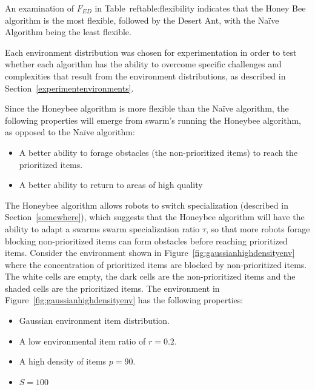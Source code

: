 An examination of $F_{ED}$ in Table~ref{table:flexibility} indicates that the Honey Bee algorithm is the most flexible, followed by the Desert Ant, with the Na\"ive Algorithm being the least flexible.

Each environment distribution was chosen for experimentation in order to test whether each algorithm has the ability to overcome specific challenges and complexities that result from the environment distributions, as described in Section~\ref{experimentenvironments}.

Since the Honeybee algorithm is more flexible than the Na\"ive algorithm, the following properties will emerge from swarm's running the Honeybee algorithm, as opposed to the Na\"ive algorithm:
\begin{itemize}
\item A better ability to forage obstacles (the non-prioritized items) to reach the prioritized items.
\item A better ability to return to areas of high quality
\end{itemize}
 
The Honeybee algorithm allows robots to switch specialization (described in Section~\ref{somewhere}), which suggests that the Honeybee algorithm will have the ability to adapt a swarms swarm specialization ratio $\tau$, so that more robots forage blocking non-prioritized items can form obstacles before reaching prioritized items. Consider the environment shown in Figure~\ref{fig:gaussianhighdensityenv} where the concentration of prioritized items are blocked by non-prioritized items. The white cells are empty, the dark cells are the non-prioritized items and the shaded cells are the prioritized items. The environment in Figure~\ref{fig:gaussianhighdensityenv} has the following properties:

\begin{itemize}
\item Gaussian environment item distribution.
\item A low environmental item ratio of $r=0.2$.
\item A high density of items $p=90$.
\item $S=100$
\end{itemize}

